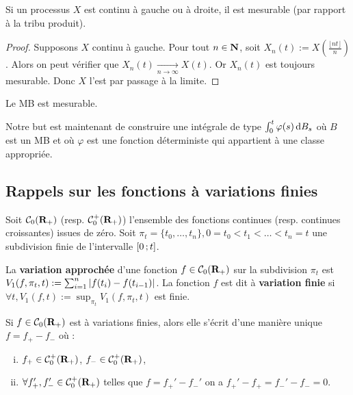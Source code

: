	\begin{pop}
		Si un processus $X$ est continu à gauche ou à droite, il est mesurable (par rapport à la tribu produit).
	\end{pop}
	
	\begin{proof}
		Supposons $X$ continu à gauche.
		Pour tout $n \in \mathbf{N}$, soit $X_n(t) := X \left( \frac{\lfloor nt \rfloor}{n} \right)$.
		Alors on peut vérifier que $X_n(t) \underset{n \to \infty}{\longrightarrow} X(t)$.
		Or $X_n(t)$ est toujours mesurable.
		Donc $X$ l'est par passage à la limite.
	\end{proof}
	
	\begin{cor}
		Le MB est mesurable.
	\end{cor}

	Notre but est maintenant de construire une intégrale de type $\int_0^t \varphi(s) \mathop{}\mathopen{}\mathrm{d} B_s$ où $B$ est un MB et où $\varphi$ est une fonction déterministe qui appartient à une classe appropriée.


\subsection{Rappels sur les fonctions à variations finies}

	Soit $\mathcal{C}_0(\mathbf{R}_+)$ (resp. $\mathcal{C}_0^+(\mathbf{R}_+)$) l'ensemble des fonctions continues (resp. continues croissantes) issues de zéro.
	Soit $\pi_t = \{ t_0,\ldots,t_n \}, 0 = t_0 < t_1 < \ldots < t_n = t$ une subdivision finie de l'intervalle $\mathopen{}\mathclose{\left[0\mathclose{}\mathpunct{};t\right]}$.
	
	\begin{defn}
		La \textbf{variation approchée} d'une fonction $f \in \mathcal{C}_0(\mathbf{R}_+)$ sur la subdivision $\pi_t$ est $V_1(f,\pi_t,t) := \sum_{i = 1}^n \left\lvert f(t_i) - f(t_{i - 1})\right\rvert$.
		La fonction $f$ est dit à \textbf{variation finie} si $\forall t, V_1(f,t) := \sup_{\pi_t} V_1(f,\pi_t,t)$ est finie.
	\end{defn}
	
	\begin{pop}
		Si $f \in \mathcal{C}_0(\mathbf{R}_+)$ est à variations finies, alors elle s'écrit d'une manière unique $f = f_+ - f_-$ où :
		\begin{enumerate}[(i)]
			\item $f_+ \in \mathcal{C}_0^+(\mathbf{R}_+)$, $f_- \in \mathcal{C}_0^+(\mathbf{R}_+)$,
			\item $\forall f_+',f_-' \in \mathcal{C}_0^+(\mathbf{R}_+)$ telles que $f = f_+' - f_-'$ on a $f_+' - f_+ = f_-' - f_- = 0$.
		\end{enumerate}
	\end{pop}
	
